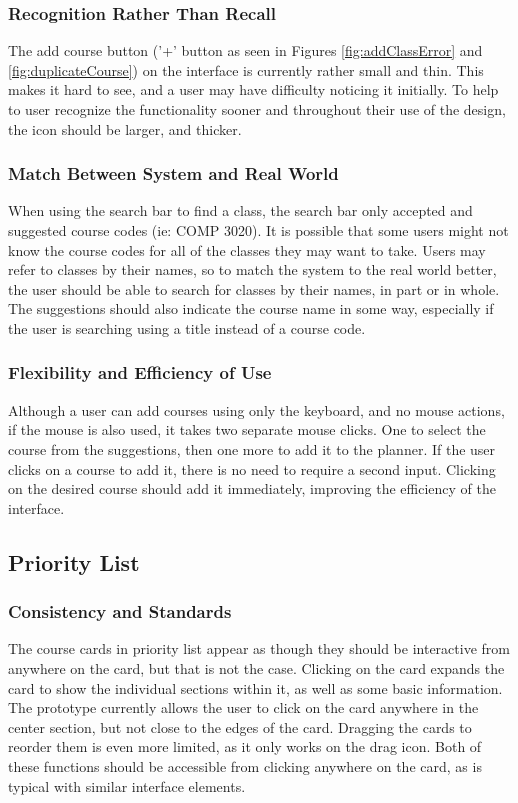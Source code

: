 \documentclass{article}
\begin{document}
\subsubsection{Recognition Rather Than Recall}
The add course button ('+' button as seen in Figures \ref{fig:addClassError} and \ref{fig:duplicateCourse}) on the interface is currently rather small and thin. This makes it hard to see, and a user may have difficulty noticing it initially. To help to user recognize the functionality sooner and throughout their use of the design, the icon should be larger, and thicker.


\subsubsection{Match Between System and Real World}
When using the search bar to find a class, the search bar only accepted and suggested course codes (ie: COMP 3020). It is possible that some users might not know the course codes for all of the classes they may want to take. Users may refer to classes by their names, so to match the system to the real world better, the user should be able to search for classes by their names, in part or in whole. The suggestions should also indicate the course name in some way, especially if the user is searching using a title instead of a course code.


\subsubsection{Flexibility and Efficiency of Use}
Although a user can add courses using only the keyboard, and no mouse actions, if the mouse is also used, it takes two separate mouse clicks. One to select the course from the suggestions, then one more to add it to the planner. If the user clicks on a course to add it, there is no need to require a second input. Clicking on the desired course should add it immediately, improving the efficiency of the interface.



\subsection{Priority List}

\subsubsection{Consistency and Standards}
The course cards in priority list appear as though they should be interactive from anywhere on the card, but that is not the case. Clicking on the card expands the card to show the individual sections within it, as well as some basic information. The prototype currently allows the user to click on the card anywhere in the center section, but not close to the edges of the card. Dragging the cards to reorder them is even more limited, as it only works on the drag icon. Both of these functions should be accessible from clicking anywhere on the card, as is typical with similar interface elements.
\end{document}
